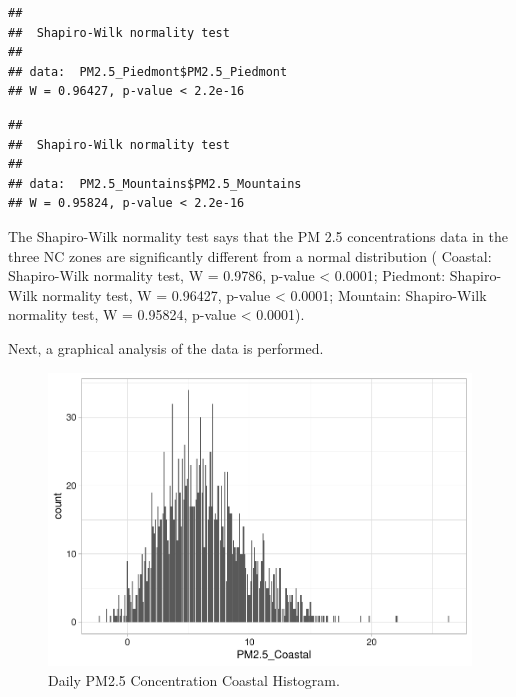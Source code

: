 \documentclass[12pt,]{article}
\newenvironment{Shaded}{\begin{snugshade}}{\end{snugshade}}
\newcommand{\KeywordTok}[1]{\textcolor[rgb]{0.13,0.29,0.53}{\textbf{#1}}}
\newcommand{\OperatorTok}[1]{\textcolor[rgb]{0.81,0.36,0.00}{\textbf{#1}}}
\newcommand{\NormalTok}[1]{#1}
\begin{document}
\begin{verbatim}
## 
##  Shapiro-Wilk normality test
## 
## data:  PM2.5_Piedmont$PM2.5_Piedmont
## W = 0.96427, p-value < 2.2e-16
\end{verbatim}

\begin{Shaded}
\end{Shaded}

\begin{verbatim}
## 
##  Shapiro-Wilk normality test
## 
## data:  PM2.5_Mountains$PM2.5_Mountains
## W = 0.95824, p-value < 2.2e-16
\end{verbatim}

The Shapiro-Wilk normality test says that the PM 2.5 concentrations data
in the three NC zones are significantly different from a normal
distribution ( Coastal: Shapiro-Wilk normality test, W = 0.9786, p-value
\textless{} 0.0001; Piedmont: Shapiro-Wilk normality test, W = 0.96427,
p-value \textless{} 0.0001; Mountain: Shapiro-Wilk normality test, W =
0.95824, p-value \textless{} 0.0001).

Next, a graphical analysis of the data is performed.

\begin{figure}
\centering
\includegraphics{Raby_ENV872_Project_files/figure-latex/unnamed-chunk-42-1.pdf}
\caption{Daily PM2.5 Concentration Coastal Histogram.
\label{Coasthistplot}}
\end{figure}
\end{document}
